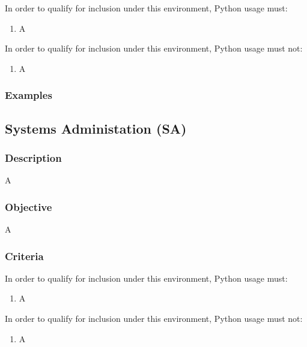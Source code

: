 			In order to qualify for inclusion under this environment, Python usage must:

			\begin{enumerate}
        		\item A
        	\end{enumerate}

			In order to qualify for inclusion under this environment, Python usage must not:

			\begin{enumerate}
        		\item A
        	\end{enumerate}

		\subsubsection{Examples}


	\subsection{Systems Administation (SA)}

		\subsubsection{Description}

			A

		\subsubsection{Objective}

			A

		\subsubsection{Criteria}

			In order to qualify for inclusion under this environment, Python usage must:

			\begin{enumerate}
        		\item A
        	\end{enumerate}

			In order to qualify for inclusion under this environment, Python usage must not:

			\begin{enumerate}
        		\item A
        	\end{enumerate}

